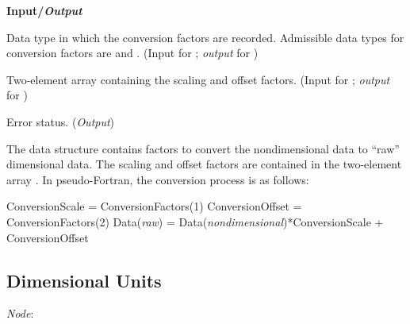 \noindent
\textbf{\textcolor{input}{Input}/\textcolor{output}{\textit{Output}}}

\begin{Ventryi}{}\raggedright
\item [\fort{DataType}]
      Data type in which the conversion factors are recorded.
      Admissible data types for conversion factors are 
      and .
      (\textcolor{input}{Input} for ;
      \textcolor{output}{\textit{output}} for )
\item [\fort{ConversionFactors}]
      Two-element array containing the scaling and offset factors.
      (\textcolor{input}{Input} for ;
      \textcolor{output}{\textit{output}} for )
\item [\fort{ier}]
      Error status.
      (\textcolor{output}{\textit{Output}})
\end{Ventryi}

The  data structure contains factors to convert
the nondimensional data to ``raw'' dimensional data.
The scaling and offset factors are contained in the two-element array
.
In pseudo-Fortran, the conversion process is as follows:

\begin{indlefttt}
ConversionScale  = ConversionFactors(1)
ConversionOffset = ConversionFactors(2)
Data(\textit{raw}) = Data(\textit{nondimensional})*ConversionScale + ConversionOffset
\end{indlefttt}

\subsection{Dimensional Units}
\label{s:dimensionalunits}

\noindent
\textit{Node}: 

